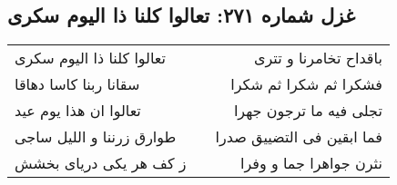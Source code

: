 \begin{center}
\section*{غزل شماره ۲۷۱: تعالوا کلنا ذا الیوم سکری}
\label{sec:0271}
\begin{longtable}{l p{0.5cm} r}
تعالوا کلنا ذا الیوم سکری
&&
باقداح تخامرنا و تتری
\\
سقانا ربنا کاسا دهاقا
&&
فشکرا ثم شکرا ثم شکرا
\\
تعالوا ان هذا یوم عید
&&
تجلی فیه ما ترجون جهرا
\\
طوارق زرننا و اللیل ساجی
&&
فما ابقین فی التضییق صدرا
\\
ز کف هر یکی دریای بخشش
&&
نثرن جواهرا جما و وفرا
\\
\end{longtable}
\end{center}
